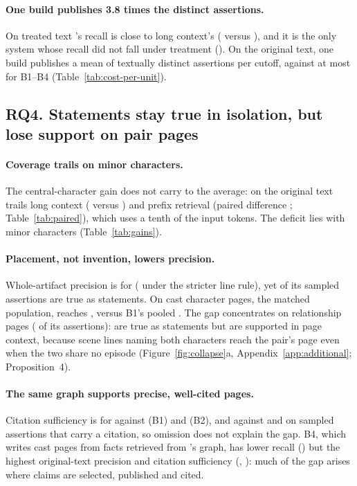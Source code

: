 \paragraph{One build publishes 3.8 times the distinct assertions.}
On treated text \sys's recall is close to long context's ( versus
), and it is the only system whose recall did not fall under
treatment (). On the original text, one build publishes a mean of
 textually distinct assertions per cutoff, against at most
 for B1--B4 (Table~\ref{tab:cost-per-unit}).

\subsection{RQ4. Statements stay true in isolation, but lose support on pair pages}
\label{sec:results-quality}


\paragraph{Coverage trails on minor characters.}
The central-character gain does not carry to the average: on the original text \sys
trails long context ( versus ) and prefix
retrieval (paired difference ; Table~\ref{tab:paired}),
which uses a tenth of the input tokens. The deficit lies with minor characters
(Table~\ref{tab:gains}).

\paragraph{Placement, not invention, lowers precision.}
Whole-artifact precision is  for \sys ( under the
stricter line rule), yet  of its sampled assertions are true as statements.
On cast character pages, the matched population, \sys reaches ,
versus B1's pooled . The gap concentrates on relationship pages
( of its assertions):  are true as
statements but  are supported in page context, because scene lines
naming both characters reach the pair's page even when the two share no episode
(Figure~\ref{fig:collapse}a, Appendix~\ref{app:additional}; Proposition~4).

\paragraph{The same graph supports precise, well-cited pages.}
Citation sufficiency is  for \sys against  (B1)
and  (B2), and  against  and
 on sampled assertions that carry a citation, so omission does not explain
the gap. B4, which writes cast pages from facts retrieved from \sys's graph, has lower
recall () but the highest original-text precision and citation
sufficiency (, ): much of the gap arises where
claims are selected, published and cited.

